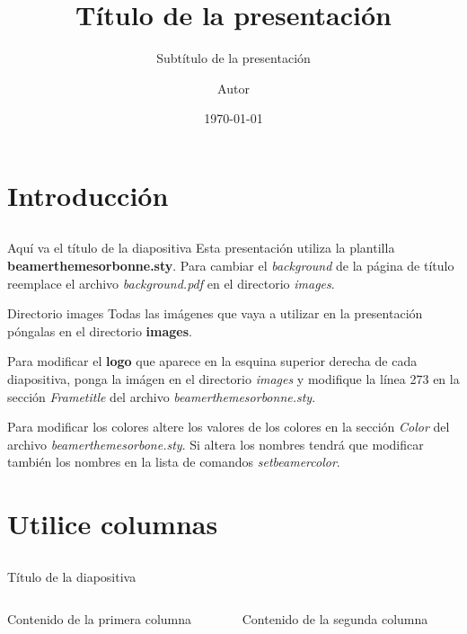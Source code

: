 \documentclass[compress,xcolor=table]{beamer}
\title{Título de la presentación}
\subtitle{Subtítulo de la presentación} %
\date{\today}
\author{Autor} %
\institute{Filiación} %
\begin{document}
\begin{frame}[plain]
	\titlepage
	\setcounter{framenumber}{0}
\end{frame}

\section{Introducción} \subsection{}

\begin{frame}{Aquí va el título de la diapositiva} %
	Esta presentación utiliza la plantilla \textbf{beamerthemesorbonne.sty}. Para cambiar el \textit{background} de la página de título reemplace el archivo \emph{background.pdf} en el directorio \emph{images}.
	
	\begin{alertblock}{Directorio images}
		Todas las imágenes que vaya a utilizar en la presentación póngalas en el directorio \textbf{images}.
	\end{alertblock}
	
	Para modificar el \textbf{logo} que aparece en la esquina superior derecha de cada diapositiva, ponga la imágen en el directorio \emph{images} y modifique la línea 273 en la sección \textit{Frametitle} del archivo \emph{beamerthemesorbonne.sty}.
	
	Para modificar los colores altere los valores de los colores en la sección \emph{Color} del archivo \emph{beamerthemesorbone.sty}. Si altera los nombres tendrá que modificar también los nombres en la lista de comandos \emph{setbeamercolor}.
\end{frame} 

\section{Utilice columnas} \subsection{}

\begin{frame}{Título de la diapositiva}
	\begin{columns}
  		\begin{column}{.45\textwidth}
  			Contenido de la primera columna
  		\end{column}
  		\begin{column}{.45\textwidth}
  			Contenido de la segunda columna
  		\end{column}
  \end{columns}
\end{frame}
\end{document}
